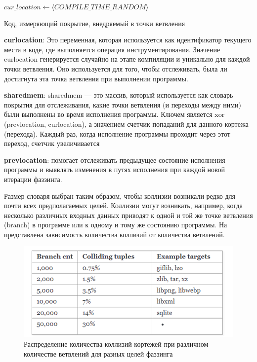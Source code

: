 \begin{algorithm}
	\SetAlgoLined 
	\DontPrintSemicolon 
	
	\BlankLine
	$cur\_location \gets \langle COMPILE\_TIME\_RANDOM \rangle$\;
	\BlankLine
	\caption{Код, измеряющий покрытие, внедряемый в точки ветвления}
	\label{alg:AlgoFDSCALING}
\end{algorithm}

\textbf{cur\textunderscore location}:
Это переменная, которая используется как идентификатор текущего места в коде, где выполняется операция инструментирования. Значение cur\textunderscore location генерируется случайно на этапе компиляции и уникально для каждой точки ветвления. Оно используется для того, чтобы отслеживать, была ли достигнута эта точка ветвления при выполнении программы.

\textbf{shared\textunderscore mem}:
shared\textunderscore mem — это массив, который используется как словарь покрытия для отслеживания, какие точки ветвления (и переходы между ними) были выполнены во время исполнения программы. Ключем является xor (prev\textunderscore location, cur\textunderscore location), а значением счетчик попаданий для данного кортежа (перехода). Каждый раз, когда исполнение программы проходит через этот переход, счетчик увеличивается

\textbf{prev\textunderscore location}:
помогает отслеживать предыдущее состояние исполнения программы и выявлять изменения в путях исполнения при каждой новой итерации фаззинга.

\par
Размер словаря выбран таким образом, чтобы коллизии возникали редко для почти всех предполагаемых целей. Коллизии могут возникать, например, когда несколько различных входных данных приводят к одной и той же точке ветвления (branch) в программе или к одному и тому же состоянию программы.
На  представлена зависимость количества коллизий от количества ветвлений.

\begin{figure}[ht] 
	\center
	\includegraphics [scale=1] {my_folder/images/coverage_measuring}
	\caption{Распределение количества коллизий кортежей при различном количестве ветвлений для разных целей фаззинга} 
	\label{fig:coverage-measuring-ch3}  
\end{figure}

